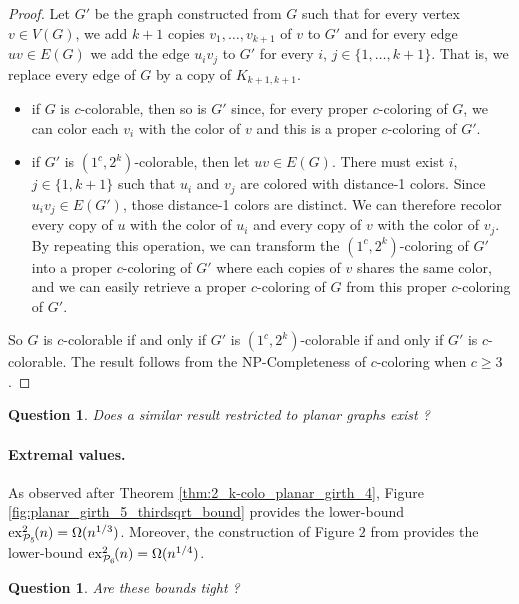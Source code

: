 \documentclass{article}
\newtheorem{question}[theorem]{Question}
\newcommand{\colo}[2]{(1^{#1}, 2^{#2})}
\newcommand{\ex}[3]{\operatorname{ex}^{#1}_{#2}\hspace{-3pt}{#3}}
\begin{document}
\begin{proof}
    Let $G'$ be the graph constructed from $G$ such that for every vertex $v \in V(G)$, we add $k + 1$ copies $v_1, \dots, v_{k + 1}$ of $v$ to $G'$ and for every edge $uv \in E(G)$  we add the edge $u_iv_j$ to $G'$ for every $i$, $j \in \{1, \dots, k + 1\}$. That is, we replace every edge of $G$ by a copy of $K_{k + 1, k + 1}$.
    \begin{itemize}
        \item if $G$ is $c$-colorable, then so is $G'$ since, for every proper $c$-coloring of $G$, we can color each $v_i$ with the color of $v$ and this is a proper $c$-coloring of $G'$.
        \item if $G'$ is $\colo{c}{k}$-colorable, then let $uv \in E(G)$. There must exist $i$, $j \in \{1, k + 1\}$ such that $u_i$ and $v_j$ are colored with distance-1 colors. Since $u_iv_j  \in E(G')$, those distance-1 colors are distinct. We can therefore recolor every copy of $u$ with the color of $u_i$ and every copy of $v$ with the color of $v_j$. By repeating this operation, we can transform the $\colo{c}{k}$-coloring of $G'$ into a proper $c$-coloring of $G'$ where each copies of $v$ shares the same color, and we can easily retrieve a proper $c$-coloring of $G$ from this proper $c$-coloring of $G'$. 
    \end{itemize}
    So $G$ is $c$-colorable if and only if $G'$ is $\colo{c}{k}$-colorable if and only if $G'$ is $c$-colorable. The result follows from the NP-Completeness of {\sc$c$-coloring} when $c \geq 3$. 
\end{proof}

\begin{question}
    Does a similar result restricted to planar graphs exist ?
\end{question}

\paragraph{Extremal values.}

As observed after Theorem \ref{thm:2_k-colo_planar_girth_4}, Figure \ref{fig:planar_girth_5_thirdsqrt_bound} provides the lower-bound $\ex{2}{\mathcal{P}_5}{(n)} = \Omega(n^{1/3})$. Moreover, the construction of Figure $2$ from \cite{choi2025propersquarecoloringssparse} provides the lower-bound $\ex{2}{\mathcal{P}_6}{(n)} = \Omega(n^{1/4})$.

\begin{question}
    Are these bounds tight ?
\end{question}
\end{document}
